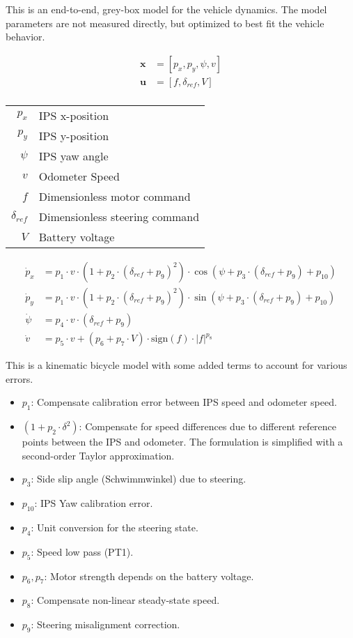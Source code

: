 
This is an end-to-end, grey-box model for the vehicle dynamics. The model parameters are not measured directly, but optimized to best fit the vehicle behavior.

\begin{align*}
\boldsymbol{x} &= [p_x, p_y, \psi, v] \\
\boldsymbol{u} &= [f, \delta_{ref}, V] \\ 
\end{align*}



\begin{center}
\begin{tabular}{ r | l }
 $p_x$ & IPS x-position  \\ 
 $p_y$ & IPS y-position   \\ 
 $\psi$ & IPS yaw angle  \\ 
 $v$ & Odometer Speed  \\ 
 $f$ & Dimensionless motor command  \\ 
 $\delta_{ref}$ & Dimensionless steering command  \\ 
 $V$ & Battery voltage  \\ 
\end{tabular}
\end{center}


\begin{align*}
\dot{p}_x &= p_1 \cdot v \cdot (1+p_2 \cdot (\delta_{ref} + p_{9})^2) \cdot \cos(\psi + p_3 \cdot (\delta_{ref} + p_{9}) + p_{10}) \\
\dot{p}_y &= p_1 \cdot v \cdot (1+p_2 \cdot (\delta_{ref} + p_{9})^2) \cdot \sin(\psi + p_3 \cdot (\delta_{ref} + p_{9}) + p_{10}) \\
\dot{\psi} &= p_4 \cdot v \cdot (\delta_{ref} + p_{9}) \\
\dot{v} &= p_5 \cdot v + (p_6 + p_7 \cdot V) \cdot \text{sign}(f) \cdot |f|^{p_8}
\end{align*}

This is a kinematic bicycle model with some added terms to account for various errors.

\begin{itemize}
\item $p_1$: Compensate calibration error between IPS speed and odometer speed. 
\item $(1+p_2 \cdot \delta^2)$: Compensate for speed differences due to different reference points between the IPS and odometer. The formulation is simplified with a second-order Taylor approximation.
\item $p_3$: Side slip angle (Schwimmwinkel) due to steering.
\item $p_{10}$: IPS Yaw calibration error.
\item $p_{4}$: Unit conversion for the steering state.
\item $p_{5}$: Speed low pass (PT1).
\item $p_{6}, p_{7}$: Motor strength depends on the battery voltage.
\item $p_{8}$: Compensate non-linear steady-state speed.
\item $p_{9}$: Steering misalignment correction.
\end{itemize}